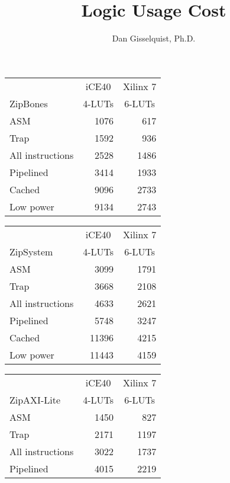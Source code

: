 \documentclass{article}
\title{Logic Usage Cost}
\author{Dan Gisselquist, Ph.D.}
\begin{document}
\maketitle

\begin{center}\begin{tabular}{|l|r|r|}\hline
 & \multicolumn{1}{c}{iCE40} & \multicolumn{1}{|c|}{Xilinx 7} \\
ZipBones & \multicolumn{1}{c}{4-LUTs} & \multicolumn{1}{|c|}{6-LUTs}\\\hline\hline
ASM			& 1076 &  617 \\\hline
Trap			& 1592 &  936 \\\hline
All instructions	& 2528 & 1486 \\\hline
Pipelined		& 3414 & 1933 \\\hline
Cached			& 9096 & 2733 \\\hline
Low power		& 9134 & 2743 \\\hline
\end{tabular}\end{center}


\begin{center}\begin{tabular}{|l|r|r|}\hline
 & \multicolumn{1}{c}{iCE40} & \multicolumn{1}{|c|}{Xilinx 7} \\
ZipSystem &\multicolumn{1}{c}{4-LUTs} & \multicolumn{1}{|c|}{6-LUTs}\\\hline\hline
ASM			& 3099 & 1791 \\\hline
Trap			& 3668 & 2108 \\\hline
All instructions	& 4633 & 2621 \\\hline
Pipelined		& 5748 & 3247 \\\hline
Cached			& 11396 & 4215 \\\hline
Low power		& 11443 & 4159 \\\hline
\end{tabular}\end{center}


\begin{center}\begin{tabular}{|l|r|r|}\hline
 & \multicolumn{1}{c}{iCE40} & \multicolumn{1}{c|}{Xilinx 7} \\
ZipAXI-Lite & \multicolumn{1}{c}{4-LUTs} & \multicolumn{1}{|c|}{6-LUTs}\\\hline\hline
ASM			& 1450 &  827 \\\hline
Trap			& 2171 & 1197 \\\hline
All instructions	& 3022 & 1737 \\\hline
Pipelined		& 4015 & 2219 \\\hline
\end{tabular}\end{center}
\end{document}
